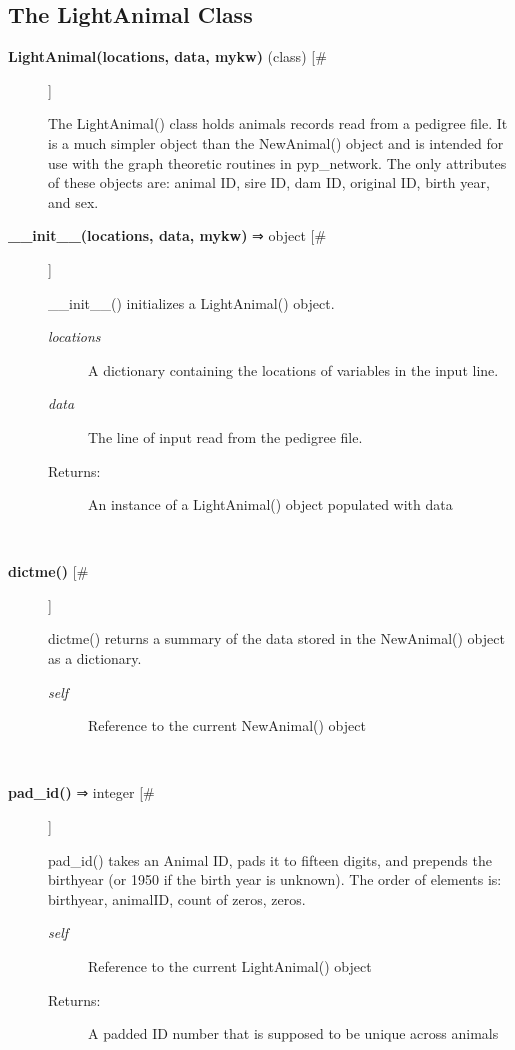 \subsection*{The LightAnimal Class}
\begin{description}
\item[\textbf{LightAnimal(locations, data, mykw)} (class) [\#]
]
\par The LightAnimal() class holds animals records read from a pedigree file. It
is a much simpler object than the NewAnimal() object and is intended for use
with the graph theoretic routines in pyp\_network. The only attributes of these
objects are: animal ID, sire ID, dam ID, original ID, birth year, and sex.

\item[\textbf{\_\_init\_\_(locations, data, mykw)} ⇒ object [\#]
]
\par \_\_init\_\_() initializes a LightAnimal() object.
\begin{description}
\item[\textit{locations}
]
A dictionary containing the locations of variables in the input line.
\item[\textit{data}
]
The line of input read from the pedigree file.
\item[Returns:
]
An instance of a LightAnimal() object populated with data
\end{description}\\

\item[\textbf{dictme()} [\#]
]
\par dictme() returns a summary of the data stored in the NewAnimal() object
as a dictionary.
\begin{description}
\item[\textit{self}
]
Reference to the current NewAnimal() object
\end{description}\\

\item[\textbf{pad\_id()} ⇒ integer [\#]
]
\par pad\_id() takes an Animal ID, pads it to fifteen digits, and prepends the birthyear
(or 1950 if the birth year is unknown).  The order of elements is: birthyear, animalID,
count of zeros, zeros.
\begin{description}
\item[\textit{self}
]
Reference to the current LightAnimal() object
\item[Returns:
]
A padded ID number that is supposed to be unique across animals
\end{description}\\


\end{description}
